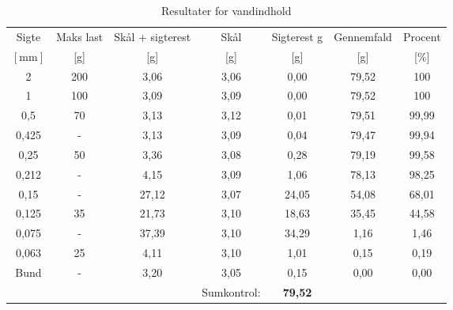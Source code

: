 \begin{table} [H]
	\begin{center}
		\begin{tabular}{ c c c c c c c} 
			\hline
		Sigte & Maks last & Skål + sigterest & Skål & Sigterest g & Gennemfald & Procent \\
		$[\text{mm}]$ & [g] & [g] & [g] & [g] & [g] & [\%] \\ \hline
		2        & 200         & 3,06               & 3,06       & 0,00           & 79,52 & 100          \\
		1        & 100         & 3,09               & 3,09       & 0,00           & 79,52 & 100          \\
		0,5      & 70          & 3,13               & 3,12       & 0,01        & 79,51 & 99,99        \\
		0,425    & -           & 3,13               & 3,09       & 0,04        & 79,47 & 99,94        \\
		0,25     & 50          & 3,36               & 3,08       & 0,28        & 79,19 & 99,58        \\
		0,212    & -          & 4,15               & 3,09       & 1,06        & 78,13 & 98,25        \\
		0,15     & -          & 27,12              & 3,07       & 24,05       & 54,08 & 68,01        \\
		0,125    & 35          & 21,73              & 3,10       & 18,63       & 35,45 & 44,58        \\
		0,075    & -          & 37,39              & 3,10       & 34,29       & 1,16 & 1,46      \\
		0,063    & 25          & 4,11               & 3,10       & 1,01        & 0,15 & 0,19      \\
		Bund     & -            & 3,20               & 3,05       & 0,15        & 0,00 & 0,00   \\
		& & & Sumkontrol: & \textbf{79,52} & & \\
		\end{tabular}
		\caption{Resultater for vandindhold}
		\label{tab:forsoget}
	\end{center}
\end{table}

